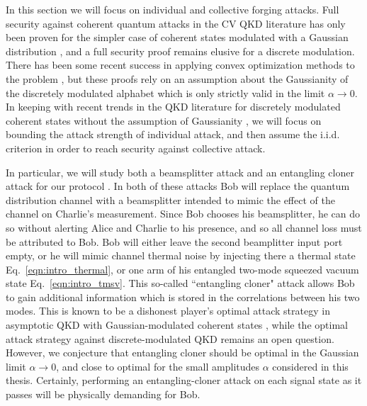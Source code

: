 In this section we will focus on individual and collective forging attacks. Full security against coherent quantum attacks in the CV QKD literature has only been proven for the simpler case of coherent states modulated with a Gaussian distribution \cite{Lodewyck2007, Leverrier2010c, Pirandola2008, Leverrier2015, Laudenbach2017, Furrer2012}, and a full security proof remains elusive for a discrete modulation. There has been some recent success in applying convex optimization methods to the problem \cite{Ghorai2019, Lin2019}, but these proofs rely on an assumption about the Gaussianity of the discretely modulated alphabet \cite{Leverrier2009} which is only strictly valid in the limit $\alpha \rightarrow 0$. In keeping with recent trends in the QKD literature for discretely modulated coherent states without the assumption of Gaussianity \cite{Papanastasiou2018},  we will focus on bounding the attack strength of individual attack, and then assume the i.i.d. criterion \cite{Leverrier2017, Laudenbach2017} in order to reach security against collective attack. 



In particular, we will study both a beamsplitter attack and an entangling cloner attack for our protocol \cite{Grosshans2002, Grosshans2003}. In both of these attacks Bob will replace the quantum distribution channel with a beamsplitter intended to mimic the effect of the channel on Charlie's measurement. Since Bob chooses his beamsplitter, he can do so without alerting Alice and Charlie to his presence, and so all channel loss must be attributed to Bob. Bob will either leave the second beamplitter input port empty, or he will mimic channel thermal noise by injecting there a thermal state Eq.~\ref{eqn:intro_thermal}, or one arm of his entangled two-mode squeezed vacuum state Eq.~\ref{eqn:intro_tmsv}. This so-called ``entangling cloner" attack allows Bob to gain additional information which is stored in the correlations between his two modes. This is known to be a dishonest player's optimal attack strategy in asymptotic QKD with Gaussian-modulated coherent states \cite{Lodewyck2007, Laudenbach2017}, while the optimal attack strategy against discrete-modulated QKD remains an open question. However, we conjecture that entangling cloner should be optimal in the Gaussian limit $\alpha \rightarrow 0$, and close to optimal for the small amplitudes $\alpha$ considered in this thesis. Certainly, performing an entangling-cloner attack on each signal state as it passes will be physically demanding for Bob.

